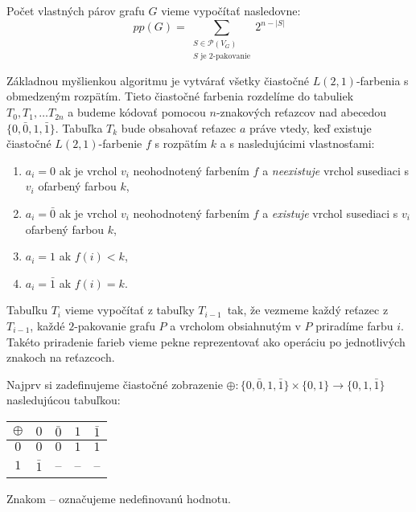 \begin{pozn}
    Počet vlastných párov grafu $G$ vieme vypočítať nasledovne:
    $$pp(G) = \sum_{\substack{S \in \mathcal{P}(V_G) \\ S \textrm{ je } 2 \textrm{-pakovanie}}} 2^{n - |S|}$$
\end{pozn}

Základnou myšlienkou algoritmu je vytvárať všetky čiastočné $L(2,1)$-farbenia s obmedzeným rozpätím.
Tieto čiastočné farbenia rozdelíme do tabuliek $T_0, T_1, \ldots T_{2n}$ a budeme kódovať pomocou
$n$-znakových reťazcov nad abecedou $\{0, \bar{0}, 1, \bar{1}\}$. Tabuľka $T_k$ bude obsahovať
reťazec $a$ práve vtedy, keď existuje čiastočné $L(2,1)$-farbenie $f$ s rozpätím $k$ a s nasledujúcimi vlastnosťami:

\begin{enumerate}
    \item $a_i = 0$ ak je vrchol $v_i$ neohodnotený farbením $f$ a \emph{neexistuje} vrchol susediaci s $v_i$ ofarbený farbou $k$,
    \item $a_i = \bar{0}$ ak je vrchol $v_i$ neohodnotený farbením $f$ a \emph{existuje} vrchol susediaci s $v_i$ ofarbený farbou $k$,
    \item $a_i = 1$ ak $f(i) < k$,
    \item $a_i = \bar{1}$ ak $f(i) = k$.
\end{enumerate}

Tabuľku $T_i$ vieme vypočítať z tabuľky $T_{i-1}$ tak, že vezmeme každý reťazec z $T_{i-1}$, každé
$2$-pakovanie grafu $P$ a vrcholom obsiahnutým v $P$ priradíme farbu $i$. Takéto priradenie farieb
vieme pekne reprezentovať ako operáciu po jednotlivých znakoch na reťazcoch.

Najprv si zadefinujeme čiastočné zobrazenie $\oplus : \{ 0, \bar{0}, 1, \bar{1}\} \times \{ 0, 1 \} \rightarrow \{0, 1, \bar{1}\}$
nasledujúcou tabuľkou:

\begin{tabular}{c | c c c c}
    $\oplus$ & $0$ & $\bar{0}$ & $1$ & $\bar{1}$ \\
    \hline
    $0$ & $0$ & $0$ & $1$ & $1$ \\
    $1$ & $\bar{1}$ & -- & -- & -- \\
\end{tabular}

Znakom -- označujeme nedefinovanú hodnotu.

